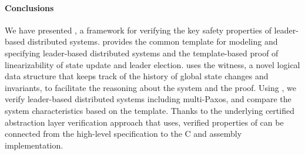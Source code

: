 \vspace{-0.2em}

\paragraph{Conclusions}

We have presented \sysname{}, a framework for verifying the key safety
properties of leader-based distributed systems. \sysname{} provides the common
template for modeling and specifying leader-based distributed systems and the
template-based proof of linearizability of state update and leader election. 
\sysname{} uses the witness, a novel logical data structure that keeps track of the
history of global state changes and invariants, to facilitate the 
reasoning about the system and the proof. Using \sysname{}, we verify
leader-based distributed systems including multi-Paxos, and compare the system
characteristics based on the \sysname{} template. Thanks to the underlying
certified abstraction layer verification approach that \sysname{} uses,
verified properties of \sysname{} can be connected from the high-level
specification to the C and assembly implementation. 




